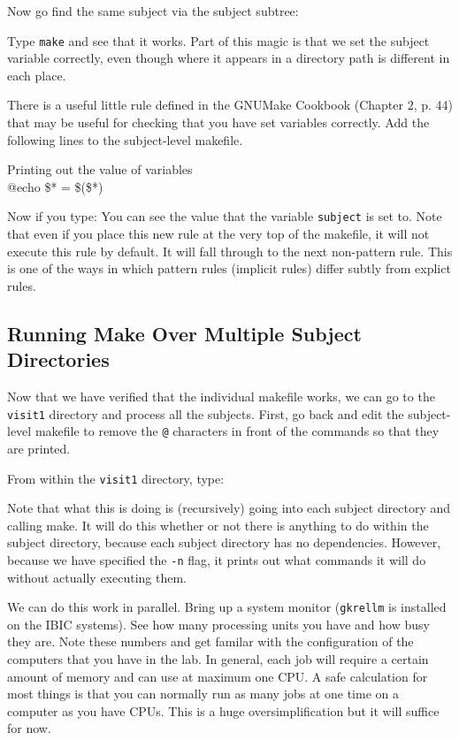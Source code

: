 Now go find the same subject via the subject subtree:

Type \texttt{make} and see that it works. Part of this magic is that we set
the subject variable correctly, even though where it appears in a
directory path is different in each place.

There is a useful little rule defined in the GNUMake Cookbook (Chapter
2, p. 44) that may be useful for checking that you have set variables correctly. Add the following lines to the subject-level makefile.


\begin{make}{Printing out the value of variables}{}
\\
\tab @echo \$* = \$(\$*)
\end{make}

Now if you type:
You can see the value that the variable \texttt{subject} is set to. Note that even if you place this new rule at the very top of the makefile, it will not execute this rule by default. It will fall through to the next non-pattern rule. This is one of the ways in which pattern rules (implicit rules) differ subtly from explict rules. 


\subsection{Running Make Over Multiple Subject Directories}
Now that we have verified that the individual makefile works, we can
go to the \texttt{visit1} directory and process all the
subjects. First, go back and edit the subject-level makefile to remove
the \texttt{@} characters in front of the commands so that they are
printed.

From within the \texttt{visit1} directory, type:

Note that what this is doing is (recursively) going into each subject directory and calling make. It will do this whether or not there is anything to do within the subject directory, because each subject directory has no dependencies. However, because we have specified the \texttt{-n} flag, it prints out what commands it will do without actually executing them.

We can do this work in parallel. Bring up a system monitor (\texttt{gkrellm} is installed on the IBIC systems). See how many processing units you have and how busy they are. Note these numbers and get familar with the configuration of the computers that you have in the lab. In general, each job will require a certain amount of memory and can use at maximum one CPU. A safe calculation for most things is that you can normally run as many jobs at one time on a computer as you have CPUs. This is a huge oversimplification but it will suffice for now. 

